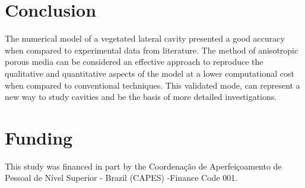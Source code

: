 \section{Conclusion}
The numerical model of a vegetated lateral cavity presented a good accuracy when compared to experimental data from literature. The method of anisotropic porous media can be considered an effective approach to reproduce the qualitative and quantitative aspects of the model at a lower computational cost when compared to conventional techniques. This validated mode, can represent a new way to study cavities and be the basis of more detailed investigations.
\section{Funding}
This study was financed in part by the Coordenação de Aperfeiçoamento de Pessoal de Nível Superior - Brazil (CAPES) -Finance Code 001.
\printbibliography[segment=\therefsegment,heading=subbibliography, title={References}]
